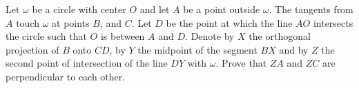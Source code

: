 Let $\omega$ be a circle with center $O$ and let $A$ be a point outside $\omega$. The tangents from $A$ touch $\omega$ at points $B$, and $C$. Let $D$ be the point at which the line $AO$ intersects the circle such that $O$ is between $A$ and $D$. Denote by $X$ the orthogonal projection of $B$ onto $CD$, by $Y$ the midpoint of the segment $BX$ and by $Z$ the second point of intersection of the line $DY$ with $\omega$. Prove that $ZA$ and $ZC$ are perpendicular to each other.